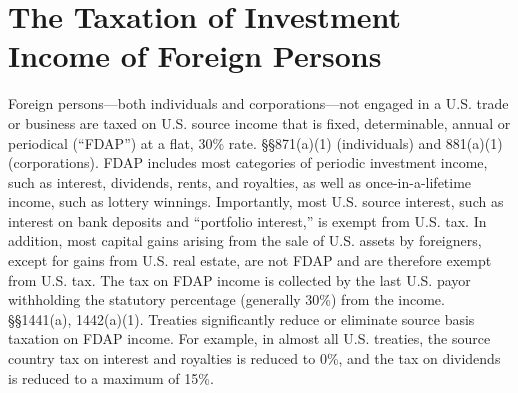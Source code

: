\chapter{The Taxation of Investment Income of Foreign Persons}

    
Foreign persons---both individuals and corporations---not engaged in a U.S. trade or business are taxed on U.S. source income that is fixed, determinable, annual or periodical (``FDAP'') at a flat, 30\% rate. \S\S 871(a)(1) (individuals) and 881(a)(1) (corporations).  FDAP includes most categories of periodic investment income, such as interest, dividends, rents, and royalties, as well as once-in-a-lifetime income, such as lottery winnings.  Importantly, most U.S. source interest, such as interest on bank deposits and ``portfolio interest,'' is exempt from U.S. tax.  In addition, most capital gains arising from the sale of U.S. assets by foreigners, except for gains from U.S. real estate, are not FDAP and are therefore exempt from U.S. tax.  The tax on FDAP income is collected by the last U.S. payor withholding the statutory percentage (generally 30\%) from the income.  \S\S 1441(a), 1442(a)(1).  Treaties significantly reduce or eliminate source basis taxation on FDAP income.  For example, in almost all U.S. treaties, the source country tax on interest and royalties is reduced to 0\%, and the tax on dividends is reduced to a maximum of 15\%. 

